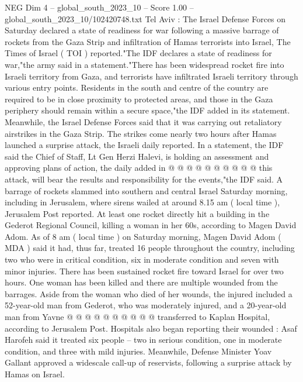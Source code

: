 \begin{textsample}{NEG Dim 4 – global\_south\_2023\_10 – Score 1.00 – global\_south\_2023\_10/102420748.txt}  \label{ex:f4_neg_040}
Tel Aviv : The Israel Defense Forces on Saturday declared a state of readiness for war following a massive barrage of rockets from the Gaza Strip and infiltration of Hamas terrorists into Israel, The Times of Israel ( TOI ) reported."The IDF declares a state of readiness for war,"the army said in a statement."There has been widespread rocket fire into Israeli territory from Gaza, and terrorists have infiltrated Israeli territory through various entry points.
Residents in the south and centre of the country are required to be in close proximity to protected areas, and those in the Gaza periphery should remain within a secure space,"the IDF added in its statement.
Meanwhile, the Israel Defense Forces said that it was carrying out retaliatory airstrikes in the Gaza Strip.
The strikes come nearly two hours after Hamas launched a surprise attack, the Israeli daily reported.
In a statement, the IDF said the Chief of Staff, Lt Gen Herzi Halevi, is holding an assessment and approving plans of action, the daily added in @ @ @ @ @ @ @ @ @ @ this attack, will bear the results and responsibility for the events,"the IDF said.
A barrage of rockets slammed into southern and central Israel Saturday morning, including in Jerusalem, where sirens wailed at around 8.15 am ( local time ), Jerusalem Post reported.
At least one rocket directly hit a building in the Gederot Regional Council, killing a woman in her 60s, according to Magen David Adom.
As of 8 am ( local time ) on Saturday morning, Magen David Adom ( MDA ) said it had, thus far, treated 16 people throughout the country, including two who were in critical condition, six in moderate condition and seven with minor injuries.
There has been sustained rocket fire toward Israel for over two hours.
One woman has been killed and there are multiple wounded from the barrages.
Aside from the woman who died of her wounds, the injured included a 52-year-old man from Gederot, who was moderately injured, and a 20-year-old man from Yavne @ @ @ @ @ @ @ @ @ @ transferred to Kaplan Hospital, according to Jerusalem Post.
Hospitals also began reporting their wounded : Asaf Harofeh said it treated six people -- two in serious condition, one in moderate condition, and three with mild injuries.
Meanwhile, Defense Minister Yoav Gallant approved a widescale call-up of reservists, following a surprise attack by Hamas on Israel.

\end{textsample}
